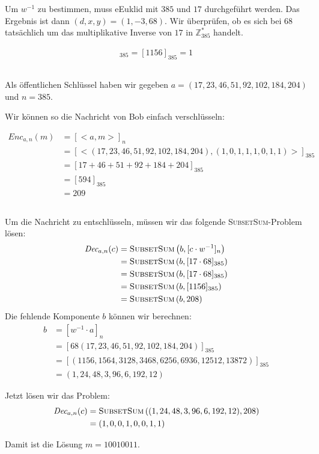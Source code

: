 \documentclass{../crypto}
\begin{document}
Um $w^{-1}$ zu bestimmen, muss eEuklid mit $385$ und $17$ durchgeführt werden. Das
Ergebnis ist dann $(d,x,y) = (1,-3,68)$. Wir überprüfen, ob es sich bei $68$
tatsächlich um das multiplikative Inverse von $17$ in $\mathbb{Z}_{385}^*$ handelt.

\begin{align*}
   [17 \cdot 68]_{385} = [1156]_{385} = 1
\end{align*}

\subsection{}

Als öffentlichen Schlüssel haben wir gegeben 
$a = (17, 23, 46, 51, 92, 102, 184, 204)$ und $n = 385$.

Wir können so die Nachricht von Bob einfach verschlüsseln:

\begin{align*}
  \textit{Enc}_{a,n}(m) &= [<a, m>]_n\\
   &= [<(17, 23, 46, 51, 92, 102, 184, 204), (1, 0, 1, 1, 1, 0, 1, 1)>]_{385} \\
   &= [17 + 46 + 51 + 92 + 184 + 204]_{385} \\
   &= [594]_{385} \\
   &= 209
\end{align*}

\subsection{}

Um die Nachricht zu entschlüsseln, müssen wir das folgende 
\textsc{SubsetSum}-Problem lösen:
\begin{align*}
  \textit{Dec}_{a,n}(c) &= \text{\textsc{SubsetSum}}\left(b, [c \cdot w^{-1}]_{n}\right) \\
                        &= \text{\textsc{SubsetSum}}\left(b, [17 \cdot 68]_{385}\right) \\
                        &= \text{\textsc{SubsetSum}}\left(b, [17 \cdot 68]_{385}\right) \\
                        &= \text{\textsc{SubsetSum}}\left(b, [1156]_{385}\right) \\
                        &= \text{\textsc{SubsetSum}}\left(b, 208\right) \\
\end{align*}
Die fehlende Komponente $b$ können wir berechnen:
\begin{align*}
  b &= [w^{-1} \cdot a]_{n} \\
    &= \left[68 (17, 23, 46, 51, 92, 102, 184, 204)\right]_{385} \\
    &= \left[(1156, 1564, 3128, 3468, 6256, 6936, 12512, 13872)\right]_{385} \\
    &= (1, 24, 48, 3, 96, 6, 192, 12)
\end{align*}

Jetzt lösen wir das Problem:
\begin{align*}
  \textit{Dec}_{a, n}(c) &= \text{\textsc{SubsetSum}}\left((1, 24, 48, 3, 96, 6, 192, 12), 208\right) \\
                         &= (1, 0, 0, 1, 0, 0, 1, 1)
\end{align*}

Damit ist die Lösung $m = 10010011$.
\end{document}
